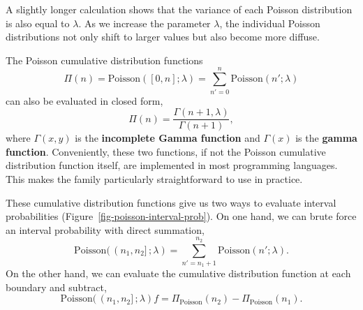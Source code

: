 \documentclass[
  letterpaper,
  DIV=11,
  numbers=noendperiod]{scrartcl}
\begin{document}
A slightly longer calculation shows that the variance of each Poisson
distribution is also equal to \(\lambda\). As we increase the parameter
\(\lambda\), the individual Poisson distributions not only shift to
larger values but also become more diffuse.

The Poisson cumulative distribution functions \[
\Pi(n)
= \mathrm{Poisson}([0, n]; \lambda)
= \sum_{n' = 0}^{n} \mathrm{Poisson}(n'; \lambda)
\] can also be evaluated in closed form, \[
\Pi(n) = \frac{ \Gamma(n + 1, \lambda) }{ \Gamma(n + 1) },
\] where \(\Gamma(x, y)\) is the \textbf{incomplete Gamma function} and
\(\Gamma(x)\) is the \textbf{gamma function}. Conveniently, these two
functions, if not the Poisson cumulative distribution function itself,
are implemented in most programming languages. This makes the family
particularly straightforward to use in practice.

These cumulative distribution functions give us two ways to evaluate
interval probabilities (Figure~\ref{fig-poisson-interval-prob}). On one
hand, we can brute force an interval probability with direct summation,
\[
\mathrm{Poisson}( \, (n_{1}, n_{2}] \, ; \lambda)
=
\sum_{n' = n_{1} + 1}^{n_{2}} \mathrm{Poisson}(n'; \lambda).
\] On the other hand, we can evaluate the cumulative distribution
function at each boundary and subtract, \[
\mathrm{Poisson}( \, (n_{1}, n_{2}] \, ; \lambda) f
=
\Pi_{\mathrm{Poisson}}(n_{2}) - \Pi_{\mathrm{Poisson}}(n_{1}).
\]
\end{document}
